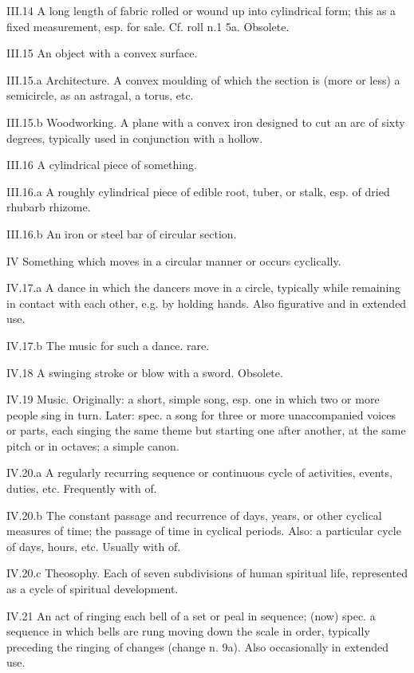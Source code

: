 \begin{compactitem}
			\item[III.14] A long length of fabric rolled or wound up into cylindrical form; this as a fixed measurement, esp. for sale. Cf. roll n.1 5a. Obsolete.
			\item[III.15] An object with a convex surface.
			\item[III.15.a] Architecture. A convex moulding of which the section is (more or less) a semicircle, as an astragal, a torus, etc.
			\item[III.15.b] Woodworking. A plane with a convex iron designed to cut an arc of sixty degrees, typically used in conjunction with a hollow.
			\item[III.16] A cylindrical piece of something.
			\item[III.16.a] A roughly cylindrical piece of edible root, tuber, or stalk, esp. of dried rhubarb rhizome.
			\item[III.16.b] An iron or steel bar of circular section.
			\item[IV] Something which moves in a circular manner or occurs cyclically.
			\item[IV.17.a] A dance in which the dancers move in a circle, typically while remaining in contact with each other, e.g. by holding hands. Also figurative and in extended use.
			\item[IV.17.b] The music for such a dance. rare.
			\item[IV.18] A swinging stroke or blow with a sword. Obsolete.
			\item[IV.19] Music. Originally: a short, simple song, esp. one in which two or more people sing in turn. Later: spec. a song for three or more unaccompanied voices or parts, each singing the same theme but starting one after another, at the same pitch or in octaves; a simple canon.
			\item[IV.20.a] A regularly recurring sequence or continuous cycle of activities, events, duties, etc. Frequently with of.
			\item[IV.20.b] The constant passage and recurrence of days, years, or other cyclical measures of time; the passage of time in cyclical periods. Also: a particular cycle of days, hours, etc. Usually with of.
			\item[IV.20.c] Theosophy. Each of seven subdivisions of human spiritual life, represented as a cycle of spiritual development.
			\item[IV.21] An act of ringing each bell of a set or peal in sequence; (now) spec. a sequence in which bells are rung moving down the scale in order, typically preceding the ringing of changes (change n. 9a). Also occasionally in extended use.

\end{compactitem}

